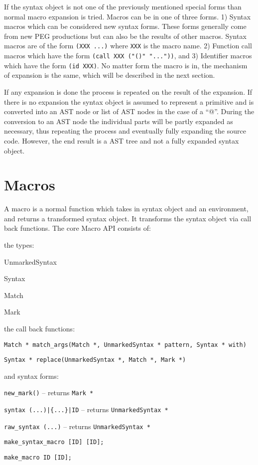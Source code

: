 \documentclass[12pt,english,letterpaper]{article}
\begin{document}
If the syntax object is not one of the previously mentioned special
forms than normal macro expansion is tried.  Macros can be in one of
three forms. 1) Syntax macros which can be considered new syntax
forms.  These forms generally come from new PEG productions but can
also be the results of other macros.  Syntax macros are of the form
\verb/(XXX ...)/ where \verb/XXX/ is the macro name.  2) Function call
macros which have the form \verb/(call XXX ("()" "..."))/, and 3)
Identifier macros which have the form \verb/(id XXX)/.  No matter form
the macro is in, the mechanism of expansion is the same, which will be
described in the next section.

If any expansion is done the process is repeated on the result of the
expansion.  If there is no expansion the syntax object is assumed to
represent a primitive and is converted into an AST node or list of AST
nodes in the case of a ``@''.  During the conversion to an AST node
the individual parts will be partly expanded as necessary, thus
repeating the process and eventually fully expanding the source code.
However, the end result is a AST tree and not a fully expanded syntax
object.

\section{Macros}
\label{macros}

A macro is a normal function which takes in syntax object and an
environment, and returns a transformed syntax object.  It transforms the
syntax object via call back functions.  The core Macro API consists of:
\begin{itemize*}
\item the types:
\begin{itemize*}
\item UnmarkedSyntax
\item Syntax
\item Match
\item Mark
\end{itemize*}
\item the call back functions:
\begin{itemize*}
\item \verb/Match * match_args(Match *, UnmarkedSyntax * pattern, Syntax * with)/
\item \verb/Syntax * replace(UnmarkedSyntax *, Match *, Mark *)/
\end{itemize*}
\item and syntax forms:
\begin{itemize*}
\item \verb/new_mark()/ -- returns \verb/Mark */
\item \verb/syntax (...)|{...}|ID/ -- returns \verb/UnmarkedSyntax */
\item \verb/raw_syntax (...)/ -- returns \verb/UnmarkedSyntax */
\item \verb/make_syntax_macro [ID] [ID];/
\item \verb/make_macro ID [ID];/
\end{itemize*}
\end{itemize*}
\end{document}
